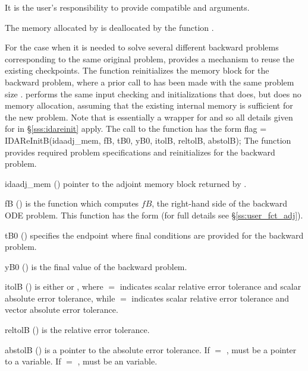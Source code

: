 {
  {\warn}It is the user's responsibility to provide compatible  and
   arguments.

  The memory allocated by  is deallocated by the function 
  .

}
For the case when it is needed to solve several different backward problems 
corresponding to the same original problem, {\idas} provides a mechanism 
to reuse the existing checkpoints. The function  reinitializes
the {\idas} memory block for the backward problem, where a prior call to
 has been made with the same problem size .
 performs the same input checking and initializations that 
 does, but does no memory allocation, 
assuming that the existing internal memory is sufficient for the new problem. 
Note that  is essentially a wrapper for 
and so all details given for  in \S\ref{sss:idareinit}
apply.
The call to the  function has the form
{
  flag = IDAReInitB(idaadj\_mem, fB, tB0, yB0, itolB, reltolB, abstolB);
}
{
  The function  provides required problem specifications 
  and reinitializes {\idas} for the backward problem.
}
{
  \begin{args}
  \item[idaadj\_mem] ()
    pointer to the adjoint memory block returned by .
  \item[fB] ()
    is the {\C} function which computes $fB$, the right-hand side of the 
    backward ODE problem. This function has the form 
     (for full details see \S\ref{ss:user_fct_adj}).
  \item[tB0] ()
    specifies the endpoint where final conditions are provided for the 
    backward problem.
  \item[yB0] ()
    is the final value of the backward problem. 
  \item[itolB] () 
    is either  or , where $=$ indicates scalar relative error 
    tolerance and scalar absolute error tolerance, while $=$ indicates scalar
    relative error tolerance and vector absolute error tolerance. 
  \item[reltolB] ()
    is the relative error tolerance.
  \item[abstolB] ()
    is a pointer to the absolute error tolerance. If  $=$ , 
    must be a pointer to a  variable. If  $=$ , 
    must be an  variable.
  \end{args}
}
